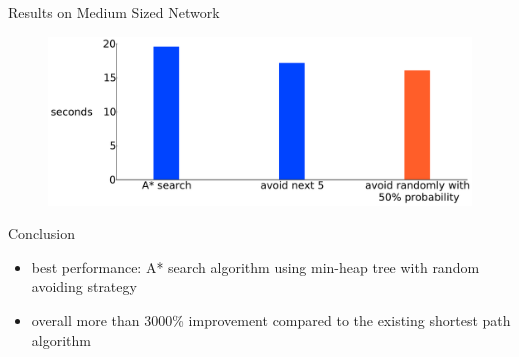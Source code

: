 \documentclass[final]{beamer}
\begin{document}
\begin{frame}{ }
\begin{columns}[t]
\begin{column}{.26\linewidth}
\begin{block}{Results on Medium Sized Network}
\begin{figure}
                    \includegraphics[width=\linewidth]{img/random_runtime}
                \end{figure}
            \end{block}
            \begin{block}{Conclusion}
                \begin{itemize}
                    \itemsep.5em
                    \item \alert{best performance}: A* search algorithm using min-heap tree with random avoiding strategy
                    \item overall more than \alert{3000\% improvement} compared to the existing shortest path algorithm
                \end{itemize}
            \end{block}
        \end{column}
    \end{columns}
\end{frame}
\end{document}
